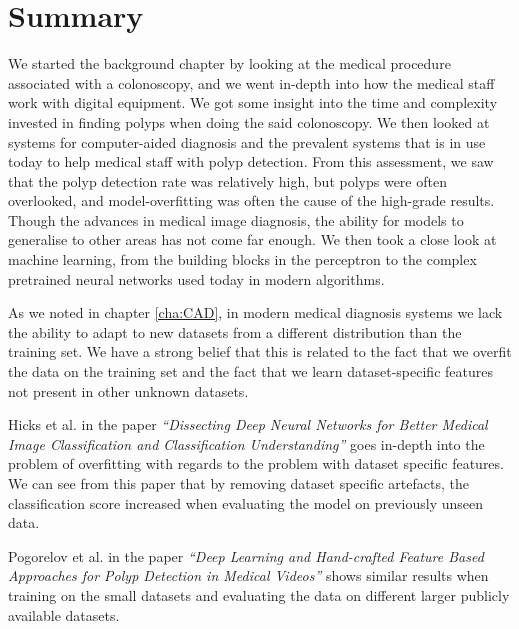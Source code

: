      
   
\section{Summary}
We started the background chapter by looking at the medical procedure associated with a colonoscopy, and we went in-depth into how the medical staff work with digital equipment. We got some insight into the time and complexity invested in finding polyps when doing the said colonoscopy.
We then looked at systems for computer-aided diagnosis and the prevalent systems that is in use today to help medical staff with polyp detection. 
From this assessment, we saw that the polyp detection rate was relatively high, but polyps were often overlooked, and model-overfitting was often the cause of the high-grade results. Though the advances in medical image diagnosis, the ability for models to generalise to other areas has not come far enough.
We then took a close look at machine learning, from the building blocks in the perceptron to the complex pretrained neural networks used today in modern algorithms. 

As we noted in chapter \ref{cha:CAD}, in modern medical diagnosis systems we lack the ability to adapt to new datasets from a different distribution than the training set. We have a strong belief that this is related to the fact that we overfit the data on the training set and the fact that we learn dataset-specific features not present in other unknown datasets.


Hicks et al. in the paper \textit{``Dissecting Deep Neural Networks for Better Medical Image Classification and Classification Understanding''} goes in-depth into the problem of overfitting with regards to the problem with dataset specific features. We can see from this paper that by removing dataset specific artefacts, the classification score increased when evaluating the model on previously unseen data.

Pogorelov et al. in the paper \textit{``Deep Learning and Hand-crafted Feature Based Approaches for Polyp Detection in Medical Videos''} shows similar results when training on the small datasets and evaluating the data on different larger publicly available datasets.

